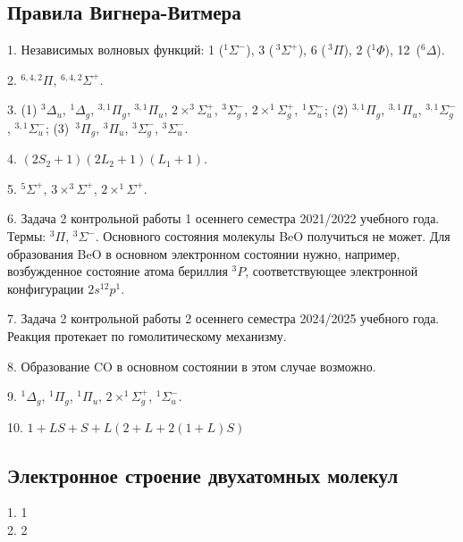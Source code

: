 \subsection{Правила Вигнера-Витмера}
1. Независимых волновых функций: 1 ($^1\Sigma^-$), 3 ($\,^3\Sigma^+$), 6 ($\,^3\Pi$), 2 ($^1\Phi$), 12~($^6\Delta$). \par
2.  $^{6,4,2}\Pi$,  $^{6,4,2}\Sigma^+$.\par
3. (1) $^3\Delta_u$, $^1\Delta_g$, $^{3,1}\Pi_g$, $^{3,1}\Pi_u$, $2 \times ^{3}\Sigma_u^+$, $^3\Sigma^-_g$, $2 \times ^{1}\Sigma_g^+$, $^{1}\Sigma_u^-$; (2) $^{3,1}\Pi_g$, $^{3,1}\Pi_u$, $^{3,1}\Sigma^-_g$, $^{3,1}\Sigma^-_u$; (3)~$^3\Pi_g$, $^3\Pi_u$, $^3\Sigma^-_g$, $^3\Sigma^-_u$.\par
4. $(2S_2+1)(2L_2+1)(L_1+1).$\par
5.  $^{5}\Sigma^+$, $3 \times ^{3}\Sigma^+$, $2 \times ^{1}\Sigma^+$.\par
6. Задача 2 контрольной работы 1 осеннего семестра 2021/2022 учебного года. Термы: $^3\Pi$, $^3\Sigma^-$. Основного состояния молекулы BeO получиться не может. Для образования BeO в основном электронном состоянии нужно, например, возбужденное состояние атома бериллия $^3P$, соответствующее электронной конфигурации $2s^12p^1$.\par
7. Задача 2 контрольной работы 2 осеннего семестра 2024/2025 учебного года. Реакция протекает по гомолитическому механизму.\par
8. Образование CO в основном состоянии в этом случае возможно.\par
9. $^1\Delta_g$, $^1\Pi_g$, $^1\Pi_u$, $2 \times ^1\Sigma^+_g$, $^1\Sigma^-_u$.\par
10. $1 + LS + S + L(2 + L + 2(1 + L)S)$\par
\newpage

\subsection{Электронное строение двухатомных молекул}
1. 1 \\
2. 2
\newpage

